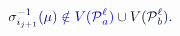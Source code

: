 \documentclass[12pt]{article}
\begin{document}
\makeatletter
\renewcommand*{\@textcolor}[3]{%
  \protect\leavevmode
  \begingroup
    \color#1{#2}#3%
  \endgroup
}
\makeatother
\begin{displaymath}
\mathcolor[RGB]{0,0,15}{\sigma} _ { \mathcolor[RGB]{0,0,30}{i} _ { \mathcolor[RGB]{0,0,45}{j} \mathcolor[RGB]{0,0,60}{+} \mathcolor[RGB]{0,0,75}{1} } } ^ { \mathcolor[RGB]{0,0,90}{-} \mathcolor[RGB]{0,0,105}{1} } \mathcolor[RGB]{0,0,120}{(} \mathcolor[RGB]{0,0,135}{\mu} \mathcolor[RGB]{0,0,150}{)} \mathcolor[RGB]{0,0,165}{\notin} \mathcolor[RGB]{0,0,180}{V} \mathcolor[RGB]{0,0,195}{(} \mathcal { \mathcolor[RGB]{0,0,210}{P} } _ { \mathcolor[RGB]{0,0,225}{a} } ^ { \mathcolor[RGB]{0,0,240}{\ell} } \mathcolor[RGB]{0,0,255}{)} \mathcolor[RGB]{0,15,0}{\cup} \mathcolor[RGB]{0,15,15}{V} \mathcolor[RGB]{0,15,30}{(} \mathcal { \mathcolor[RGB]{0,15,45}{P} } _ { \mathcolor[RGB]{0,15,60}{b} } ^ { \mathcolor[RGB]{0,15,75}{\ell} } \mathcolor[RGB]{0,15,90}{)} \mathcolor[RGB]{0,15,105}{.}
\end{displaymath}
\end{document}
